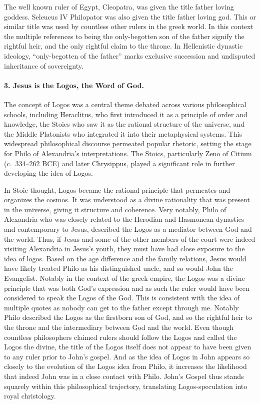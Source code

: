 The well known ruler of Egypt, Cleopatra, was given the title father loving goddess.
Seleucus IV Philopator was also given the title father loving god.
This or similar title was used by countless other rulers in the greek world.
In this context the multiple references to being the only-begotten son of the father signify the rightful heir, and the only rightful claim to the throne.
In Hellenistic dynastic ideology, “only-begotten of the father” marks exclusive succession and undisputed inheritance of sovereignty.

\paragraph{3.
Jesus is the Logos, the Word of God.}\label{par:jesus-is-the-logos-the-word-of-god.}
The concept of Logos was a central theme debated across various philosophical schools, including Heraclitus, who first introduced it as a principle of order and knowledge, the Stoics who saw it as the rational structure of the universe, and the Middle Platonists who integrated it into their metaphysical systems.
This widespread philosophical discourse permeated popular rhetoric, setting the stage for Philo of Alexandria’s interpretations.
The Stoics, particularly Zeno of Citium (c.~334–262 BCE) and later Chrysippus, played a significant role in further developing the idea of Logos.

In Stoic thought, Logos became the rational principle that permeates and organizes the cosmos.
It was understood as a divine rationality that was present in the universe, giving it structure and coherence.
Very notably, Philo of Alexandria who was closely related to the Herodian and Hasmonean dynasties and contemporary to Jesus, described the Logos as a mediator between God and the world.
Thus, if Jesus and some of the other members of the court were indeed visiting Alexandria in Jesus’s youth, they must have had close exposure to the idea of logos.
Based on the age difference and the family relations, Jesus would have likely treated Philo as his distinguished uncle, and so would John the Evangelist.
Notably in the context of the greek empire, the Logos was a divine principle that was both God’s expression and as such the ruler would have been considered to speak the Logos of the God.
This is consistent with the idea of multiple quotes as nobody can get to the father except through me.
Notably Philo described the Logos as the firstborn son of God, and so the rightful heir to the throne and the intermediary between God and the world.
Even though countless philosophers claimed rulers should follow the Logos and called the Logos the divine, the title of the Logos itself does not appear to have been given to any ruler prior to John’s gospel.
And as the idea of Logos in John appears so closely to the evolution of the Logos idea from Philo, it increases the likelihood that indeed John was in a close contact with Philo.
John’s Gospel thus stands squarely within this philosophical trajectory, translating Logos-speculation into royal christology.

